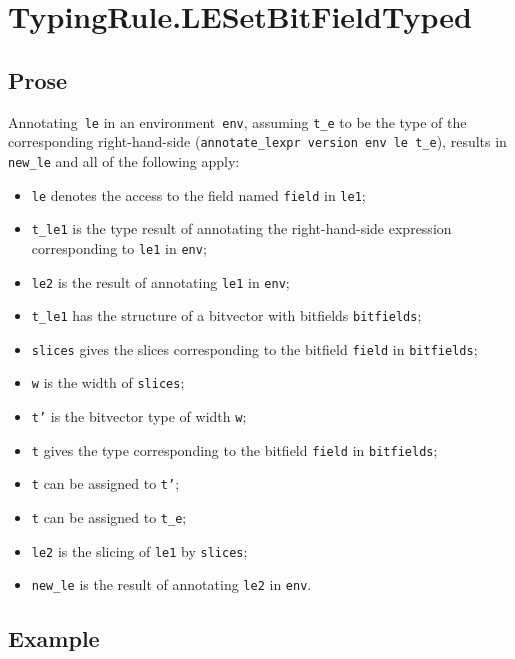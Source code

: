 \documentclass{book}
\begin{document}

\section{TypingRule.LESetBitFieldTyped \label{sec:TypingRule.LESetBitFieldTyped}}

    \subsection{Prose}
   Annotating~\texttt{le} in an environment~\texttt{env}, assuming
\texttt{t\_e} to be the type of the corresponding right-hand-side
(\texttt{annotate\_lexpr version env le t\_e}), results in \texttt{new\_le} and
all of the following apply:
   \begin{itemize}
   \item \texttt{le} denotes the access to the field named \texttt{field} in \texttt{le1};
   \item \texttt{t\_le1} is the type result of annotating the right-hand-side expression corresponding to \texttt{le1} in \texttt{env};
   \item \texttt{le2} is the result of annotating \texttt{le1} in \texttt{env};
   \item \texttt{t\_le1} has the structure of a bitvector with bitfields \texttt{bitfields};
   \item \texttt{slices} gives the slices corresponding to the bitfield \texttt{field} in
      \texttt{bitfields};
   \item \texttt{w} is the width of \texttt{slices};
   \item \texttt{t'} is the bitvector type of width \texttt{w};
   \item \texttt{t} gives the type corresponding to the bitfield \texttt{field} in
      \texttt{bitfields};
   \item \texttt{t} can be assigned to \texttt{t'};
   \item \texttt{t} can be assigned to \texttt{t\_e};
   \item \texttt{le2} is the slicing of \texttt{le1} by \texttt{slices};
   \item \texttt{new\_le} is the result of annotating \texttt{le2} in \texttt{env}.
   \end{itemize}

  \subsection{Example}
\end{document}
